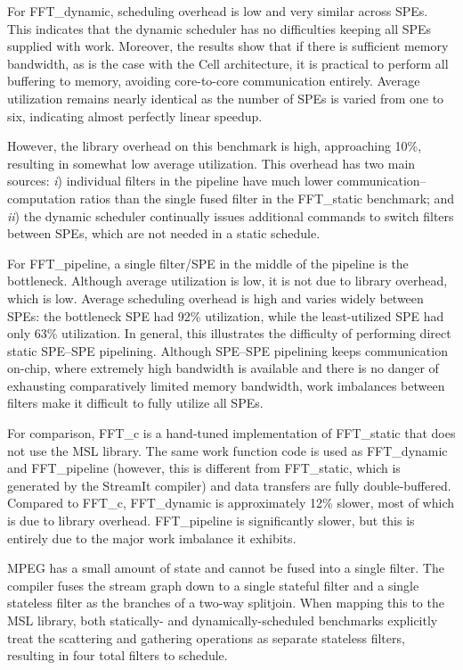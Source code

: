 For \textsf{FFT\_dynamic}, scheduling overhead is low and very similar across SPEs.
This indicates that the dynamic scheduler has no difficulties keeping all SPEs supplied with work.
Moreover, the results show that
if there is sufficient memory bandwidth, as is the case with the Cell architecture, it is practical to
perform all buffering to memory, avoiding core-to-core communication entirely.
Average utilization remains nearly identical as the number of SPEs is varied from one to six,
indicating almost perfectly linear speedup.

However, the library overhead on this benchmark is high, approaching 10\%, resulting in somewhat low average utilization. This overhead has two main sources: \emph{i}) individual filters in the pipeline have much lower communication--computation ratios than the single fused filter in the \textsf{FFT\_static} benchmark; and \emph{ii}) the dynamic scheduler continually issues additional commands to switch filters between SPEs, which are not needed in a static schedule.

For \textsf{FFT\_pipeline}, a single filter/SPE in the middle of the pipeline is the bottleneck.
Although average utilization is low, it is not due to library overhead, which is low.
Average scheduling overhead is high and varies widely between SPEs:
the bottleneck SPE had 92\% utilization, while the least-utilized SPE had only 63\% utilization.
In general, this illustrates the difficulty of performing direct static SPE--SPE pipelining.
Although SPE--SPE pipelining keeps communication on-chip, where extremely high bandwidth
is available and there is no danger of exhausting comparatively limited memory bandwidth,
work imbalances between filters make it difficult to fully utilize all SPEs.

For comparison, \textsf{FFT\_c} is a hand-tuned implementation of \textsf{FFT\_static} that
does not use the MSL library. The same work function code is used as \textsf{FFT\_dynamic} and
\textsf{FFT\_pipeline} (however, this is different from \textsf{FFT\_static},
which is generated by the StreamIt compiler) and data transfers are fully double-buffered.
Compared to \textsf{FFT\_c}, \textsf{FFT\_dynamic} is approximately 12\% slower, most of which
is due to library overhead. \textsf{FFT\_pipeline} is significantly slower, but this
is entirely due to the major work imbalance it exhibits.

MPEG has a small amount of state and cannot be fused into a single filter.
The compiler fuses the stream graph down to a single stateful filter and
a single stateless filter as the branches of a two-way splitjoin.
When mapping this to the MSL library, both statically- and dynamically-scheduled benchmarks
explicitly treat the scattering and gathering operations as separate stateless filters,
resulting in four total filters to schedule.

